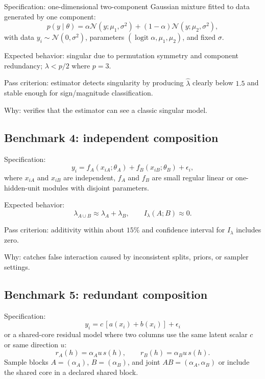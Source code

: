 \documentclass[11pt]{article}
\begin{document}
Specification: one-dimensional two-component Gaussian mixture fitted to data generated by one component:
\begin{equation}
  p(y\mid\theta)
  = \alpha\mathcal{N}(y;\mu_1,\sigma^2)
  + (1-\alpha)\mathcal{N}(y;\mu_2,\sigma^2),
\end{equation}
with data $y_i\sim\mathcal{N}(0,\sigma^2)$, parameters $(\operatorname{logit}\alpha,\mu_1,\mu_2)$, and fixed $\sigma$.

Expected behavior: singular due to permutation symmetry and component redundancy; $\lambda < p/2$ where $p=3$.

Pass criterion: estimator detects singularity by producing $\hat\lambda$ clearly below $1.5$ and stable enough for sign/magnitude classification.

Why: verifies that the estimator can see a classic singular model.

\subsection{Benchmark 4: independent composition}

Specification:
\begin{equation}
  y_i = f_A(x_{iA};\theta_A) + f_B(x_{iB};\theta_B) + \epsilon_i,
\end{equation}
where $x_{iA}$ and $x_{iB}$ are independent, $f_A$ and $f_B$ are small regular linear or one-hidden-unit modules with disjoint parameters.

Expected behavior:
\begin{equation}
  \lambda_{A\cup B} \approx \lambda_A + \lambda_B,
  \qquad I_\lambda(A;B)\approx 0.
\end{equation}

Pass criterion: additivity within about $15\%$ and confidence interval for $I_\lambda$ includes zero.

Why: catches false interaction caused by inconsistent splits, priors, or sampler settings.

\subsection{Benchmark 5: redundant composition}

Specification:
\begin{equation}
  y_i = c\,[a(x_i)+b(x_i)] + \epsilon_i
\end{equation}
or a shared-core residual model where two columns use the same latent scalar $c$ or same direction $u$:
\begin{equation}
  r_A(h)=\alpha_A u\,s(h),\qquad r_B(h)=\alpha_B u\,s(h).
\end{equation}
Sample blocks $A=(\alpha_A)$, $B=(\alpha_B)$, and joint $AB=(\alpha_A,\alpha_B)$ or include the shared core in a declared shared block.
\end{document}

